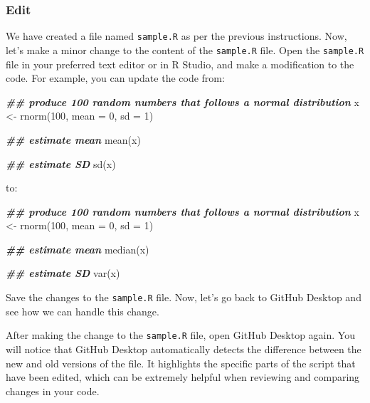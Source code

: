 \documentclass[
]{article}
\newenvironment{Shaded}{\begin{snugshade}}{\end{snugshade}}
\newcommand{\AttributeTok}[1]{\textcolor[rgb]{0.77,0.63,0.00}{#1}}
\newcommand{\DecValTok}[1]{\textcolor[rgb]{0.00,0.00,0.81}{#1}}
\newcommand{\DocumentationTok}[1]{\textcolor[rgb]{0.56,0.35,0.01}{\textbf{\textit{#1}}}}
\newcommand{\FunctionTok}[1]{\textcolor[rgb]{0.00,0.00,0.00}{#1}}
\newcommand{\NormalTok}[1]{#1}
\newcommand{\OtherTok}[1]{\textcolor[rgb]{0.56,0.35,0.01}{#1}}
\begin{document}
\hypertarget{edit}{%
\subsubsection{Edit}\label{edit}}

We have created a file named \texttt{sample.R} as per the previous instructions. Now, let's make a minor change to the content of the \texttt{sample.R} file. Open the \texttt{sample.R} file in your preferred text editor or in R Studio, and make a modification to the code. For example, you can update the code from:

\begin{Shaded}
\begin{Highlighting}[]
\DocumentationTok{\#\# produce 100 random numbers that follows a normal distribution}
\NormalTok{x }\OtherTok{\textless{}{-}} \FunctionTok{rnorm}\NormalTok{(}\DecValTok{100}\NormalTok{, }\AttributeTok{mean =} \DecValTok{0}\NormalTok{, }\AttributeTok{sd =} \DecValTok{1}\NormalTok{)}

\DocumentationTok{\#\# estimate mean}
\FunctionTok{mean}\NormalTok{(x)}

\DocumentationTok{\#\# estimate SD}
\FunctionTok{sd}\NormalTok{(x)}
\end{Highlighting}
\end{Shaded}

to:

\begin{Shaded}
\begin{Highlighting}[]
\DocumentationTok{\#\# produce 100 random numbers that follows a normal distribution}
\NormalTok{x }\OtherTok{\textless{}{-}} \FunctionTok{rnorm}\NormalTok{(}\DecValTok{100}\NormalTok{, }\AttributeTok{mean =} \DecValTok{0}\NormalTok{, }\AttributeTok{sd =} \DecValTok{1}\NormalTok{)}

\DocumentationTok{\#\# estimate mean}
\FunctionTok{median}\NormalTok{(x)}

\DocumentationTok{\#\# estimate SD}
\FunctionTok{var}\NormalTok{(x)}
\end{Highlighting}
\end{Shaded}

Save the changes to the \texttt{sample.R} file. Now, let's go back to GitHub Desktop and see how we can handle this change.

After making the change to the \texttt{sample.R} file, open GitHub Desktop again. You will notice that GitHub Desktop automatically detects the difference between the new and old versions of the file. It highlights the specific parts of the script that have been edited, which can be extremely helpful when reviewing and comparing changes in your code.
\end{document}
